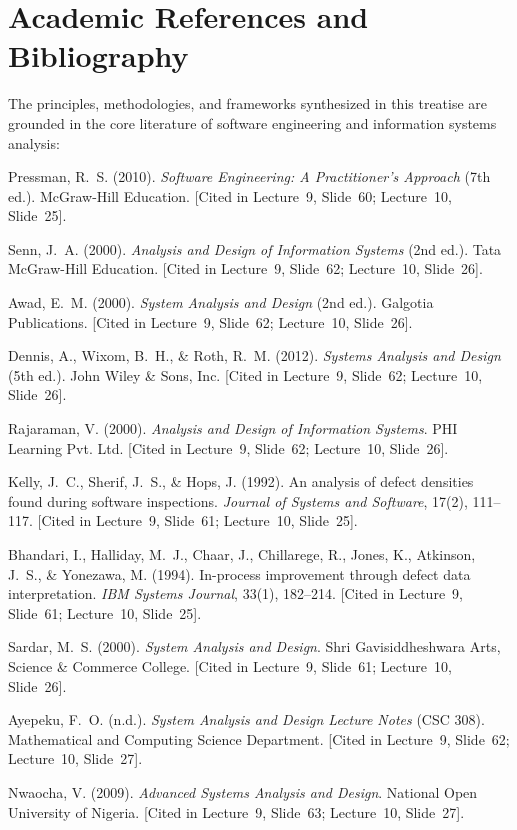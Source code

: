 \documentclass[11pt,a4paper]{article}
\begin{document}
\section[References and Bibliography]{Academic References and Bibliography}
\label{sec:references}

The principles, methodologies, and frameworks synthesized in this treatise are grounded in the core literature of software engineering and information systems analysis:

\begin{enumerate}[label={[\arabic*]}]
    \item Pressman, R.~S. (2010). \textit{Software Engineering: A Practitioner's Approach} (7th ed.). McGraw-Hill Education. [Cited in Lecture~9, Slide~60; Lecture~10, Slide~25].
    \item Senn, J.~A. (2000). \textit{Analysis and Design of Information Systems} (2nd ed.). Tata McGraw-Hill Education. [Cited in Lecture~9, Slide~62; Lecture~10, Slide~26].
    \item Awad, E.~M. (2000). \textit{System Analysis and Design} (2nd ed.). Galgotia Publications. [Cited in Lecture~9, Slide~62; Lecture~10, Slide~26].
    \item Dennis, A., Wixom, B.~H., \& Roth, R.~M. (2012). \textit{Systems Analysis and Design} (5th ed.). John Wiley \& Sons, Inc. [Cited in Lecture~9, Slide~62; Lecture~10, Slide~26].
    \item Rajaraman, V. (2000). \textit{Analysis and Design of Information Systems}. PHI Learning Pvt. Ltd. [Cited in Lecture~9, Slide~62; Lecture~10, Slide~26].
    \item Kelly, J.~C., Sherif, J.~S., \& Hops, J. (1992). An analysis of defect densities found during software inspections. \textit{Journal of Systems and Software}, 17(2), 111--117. [Cited in Lecture~9, Slide~61; Lecture~10, Slide~25].
    \item Bhandari, I., Halliday, M.~J., Chaar, J., Chillarege, R., Jones, K., Atkinson, J.~S., \& Yonezawa, M. (1994). In-process improvement through defect data interpretation. \textit{IBM Systems Journal}, 33(1), 182--214. [Cited in Lecture~9, Slide~61; Lecture~10, Slide~25].
    \item Sardar, M.~S. (2000). \textit{System Analysis and Design}. Shri Gavisiddheshwara Arts, Science \& Commerce College. [Cited in Lecture~9, Slide~61; Lecture~10, Slide~26].
    \item Ayepeku, F.~O. (n.d.). \textit{System Analysis and Design Lecture Notes} (CSC 308). Mathematical and Computing Science Department. [Cited in Lecture~9, Slide~62; Lecture~10, Slide~27].
    \item Nwaocha, V. (2009). \textit{Advanced Systems Analysis and Design}. National Open University of Nigeria. [Cited in Lecture~9, Slide~63; Lecture~10, Slide~27].
\end{enumerate}
\end{document}
